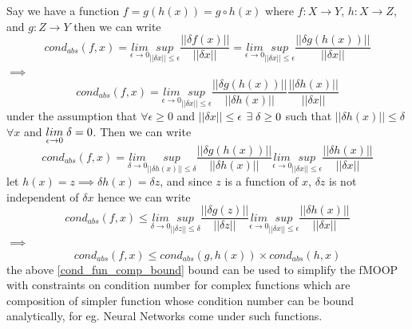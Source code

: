 Say we have a function $f=g(h(x)) = g \circ h(x)$ where $f:X\to Y$, $h:X\to Z$, and $g:Z\to Y$ then we can write
\begin{equation}
    cond_{abs}(f,x) = \underset{\epsilon \to 0}{lim}\underset{||\delta x||\le \epsilon}{sup} \frac{||\delta f(x)||}{||\delta x||} = \underset{\epsilon \to 0}{lim}\underset{||\delta x||\le \epsilon}{sup} \frac{||\delta g(h(x))||}{||\delta x||}
\end{equation}
$\implies$
\begin{equation}
    cond_{abs}(f,x) = \underset{\epsilon \to 0}{lim}\underset{||\delta x||\le \epsilon}{sup} \frac{||\delta g(h(x))||}{||\delta h(x)||}\frac{||\delta h(x)||}{||\delta x||}
\end{equation}
under the assumption that $\forall \epsilon \ge 0$ and $||\delta x||
\le \epsilon$ $\exists\hspace{1mm} \delta \ge 0$ such that $||\delta h(x)|| \le \delta$ $\forall x$ and $\underset{\epsilon \to 0}{lim}\hspace{1mm} \delta = 0$. Then we can write
\begin{equation}
    cond_{abs}(f,x) = \underset{\delta \to 0}{lim}\underset{||\delta h(x)||\le \delta}{sup} \frac{||\delta g(h(x))||}{||\delta h(x)||} \underset{\epsilon \to 0}{lim}\underset{||\delta x||\le \epsilon}{sup} \frac{||\delta h(x)||}{||\delta x||}
\end{equation}
let $h(x) = z \implies \delta h(x) = \delta z $, and since $z$ is a function of $x$, $\delta z$ is not independent of $\delta x$ hence we can write
\begin{equation}
    cond_{abs}(f,x) \le \underset{\delta \to 0}{lim}\underset{||\delta z||\le \delta}{sup} \frac{||\delta g(z)||}{||\delta z||} \underset{\epsilon \to 0}{lim}\underset{||\delta x||\le \epsilon}{sup} \frac{||\delta h(x)||}{||\delta x||}
\end{equation}
$\implies$
\begin{equation} \label{cond_fun_comp_bound}
    cond_{abs}(f,x) \le cond_{abs}(g,h(x))\times cond_{abs}(h,x)
\end{equation}
the above \ref{cond_fun_comp_bound} bound can be used to simplify the fMOOP with constraints on condition number for complex functions which are composition of simpler function whose condition number can be bound analytically, for eg. Neural Networks come under such functions.

